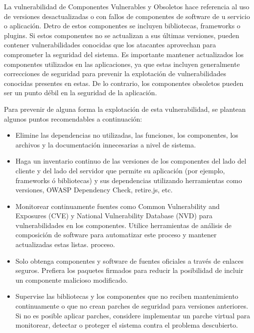 \documentclass[12pt,oneside,a4paper]{book}
\begin{document}
\begin{enumerate}
\begin{enumerate}
        \hspace{20pt}
        La vulnerabilidad de Componentes Vulnerables y Obsoletos hace referencia al uso de versiones desactualizadas o con fallos de componentes de software de u servicio o aplicación. Detro de estos componentes se incluyen bibliotecas, frameworks o plugins. Si estos componentes no se actualizan a sus últimas versiones, pueden contener vulnerabilidades conocidas que los atacantes aprovechan para comprometer la seguridad del sistema. Es importante mantener actualizados los componentes utilizados en las aplicaciones, ya que estas incluyen generalmente correcciones de seguridad para prevenir la explotación de vulnerabilidades conocidas presentes en estas. De lo contrario, los componentes obsoletos pueden ser un punto débil en la seguridad de la aplicación.

        \vspace{1em}

        \hspace{20pt}
        Para prevenir de alguna forma la explotación de esta vulnerabilidad, se plantean algunos puntos recomendables a continuación:

        \vspace{1em}

        \begin{itemize}
            \item Elimine las dependencias no utilizadas, las funciones, los componentes, los archivos y la documentación innecesarias a nivel de sistema.
            \item Haga un inventario continuo de las versiones de los componentes del lado del cliente y del lado del servidor que permite su aplicación (por ejemplo, frameworks ó bibliotecas) y sus dependencias utilizando herramientas como versiones, OWASP Dependency Check, retire.js, etc.
            \item Monitorear continuamente fuentes como Common Vulnerability and Exposures (CVE) y National Vulnerability Database (NVD) para vulnerabilidades en los componentes. Utilice herramientas de análisis de composición de software para automatizar este proceso y mantener actualizadas estas listas. proceso.
            \item Solo obtenga componentes y software de fuentes oficiales a través de enlaces seguros. Prefiera los paquetes firmados para reducir la posibilidad de incluir un componente malicioso modificado.
            \item Supervise las bibliotecas y los componentes que no reciben mantenimiento continuamente o que no crean parches de seguridad para versiones anteriores. Si no es posible aplicar parches, considere implementar un parche virtual para monitorear, detectar o proteger el sistema contra el problema descubierto.
        \end{itemize}


\end{enumerate}
\end{enumerate}
\end{document}
